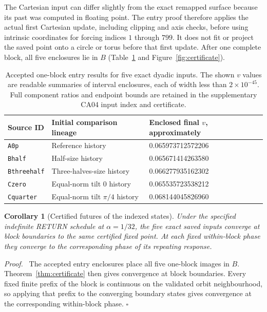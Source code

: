 \documentclass[11pt,a4paper]{article}
\newenvironment{proof}{\par\noindent\textit{Proof.}\ }{\hfill$\square$\par}
\newtheorem{corollary}[theorem]{Corollary}
\numberwithin{equation}{section}
\begin{document}
The Cartesian input can differ slightly from the exact remapped surface because its past was computed in floating point. The entry proof therefore applies the actual first Cartesian update, including clipping and axis checks, before using intrinsic coordinates for forcing indices $1$ through $799$. It does not fit or project the saved point onto a circle or torus before that first update. After one complete block, all five enclosures lie in $B$ (Table~\ref{tab:entry} and Figure~\ref{fig:certificate}).

\begin{table}[htbp]
\centering\small
\caption{Accepted one-block entry results for five exact dyadic inputs. The shown $v$ values are readable summaries of interval enclosures, each of width less than $2\times10^{-45}$. Full component ratios and endpoint bounds are retained in the supplementary CA04 input index and certificate.}\label{tab:entry}
\begin{tabular}{lll}
\toprule
Source ID & Initial comparison lineage & Enclosed final $v$, approximately \\
\midrule
\texttt{A0p} & Reference history & 0.065973712572206 \\
\texttt{Bhalf} & Half-size history & 0.065671414263580 \\
\texttt{Bthreehalf} & Three-halves-size history & 0.066277935162302 \\
\texttt{Czero} & Equal-norm tilt $0$ history & 0.065535723538212 \\
\texttt{Cquarter} & Equal-norm tilt $\pi/4$ history & 0.068144045826960 \\
\bottomrule
\end{tabular}
\end{table}

\begin{corollary}[Certified futures of the indexed states]\label{thm:entry}
Under the specified indefinite RETURN schedule at $\alpha=1/32$, the five exact saved inputs converge at block boundaries to the same certified fixed point. At each fixed within-block phase they converge to the corresponding phase of its repeating response.
\end{corollary}
\begin{proof}
The accepted entry enclosures place all five one-block images in $B$. Theorem~\ref{thm:certificate} then gives convergence at block boundaries. Every fixed finite prefix of the block is continuous on the validated orbit neighbourhood, so applying that prefix to the converging boundary states gives convergence at the corresponding within-block phase.
\end{proof}
\end{document}
